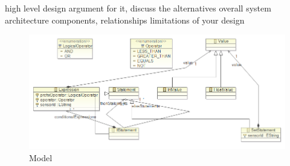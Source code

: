 high level design
argument for it, discuss the alternatives
overall system architecture
components, relationships
limitations of your design

\begin{figure}[t]
\includegraphics[width=1.00\columnwidth]{model.png}
\caption{Model}
\end{figure}